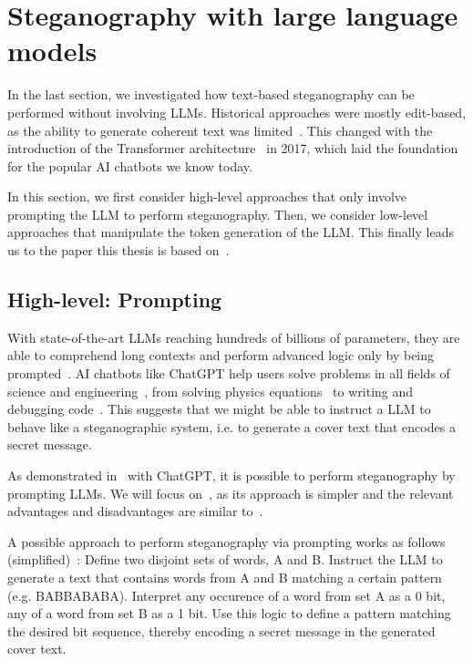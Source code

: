 \section{Steganography with large language models}
\label{sec:steganographyWithLLMs}
In the last section, we investigated how text-based steganography can be performed without involving \glspl{LLM}. Historical approaches were mostly edit-based, as the ability to generate coherent text was limited~\cite{zieglerNeuralLinguisticSteganography2019}. This changed with the introduction of the Transformer architecture~\cite{vaswaniAttentionAllYou2023} in 2017, which laid the foundation for the popular \gls{AI} chatbots we know today.

In this section, we first consider high-level approaches that only involve prompting the \gls{LLM} to perform steganography. Then, we consider low-level approaches that manipulate the token generation of the \gls{LLM}. This finally leads us to the paper this thesis is based on~\cite{zieglerNeuralLinguisticSteganography2019}.

\subsection{High-level: Prompting}
\label{sec:highLevelPrompting}
With state-of-the-art \glspl{LLM} reaching hundreds of billions of parameters, they are able to comprehend long contexts and perform advanced logic only by being prompted~\cite{hossainLLMProSAnalyzingLarge2025}. \gls{AI} chatbots like ChatGPT help users solve problems in all fields of science and engineering~\cite{schmidgallAgentLaboratoryUsing2025}, from solving physics equations~\cite{songLLMFeynmanLeveragingLarge2025,panQuantumManybodyPhysics2025} to writing and debugging code~\cite{leeGitHubRecentBugs2024,leeUnifiedDebuggingApproach2024,tianDebugBenchEvaluatingDebugging2024,shiCodeCorrectnessClosing2024}. This suggests that we might be able to instruct a \gls{LLM} to behave like a steganographic system, i.e. to generate a cover text that encodes a secret message.

As demonstrated in~\cite{steinebachNaturalLanguageSteganography2024,wuPromptingSteganographyNew2024} with ChatGPT, it is possible to perform steganography by prompting \glspl{LLM}. We will focus on~\cite{steinebachNaturalLanguageSteganography2024}, as its approach is simpler and the relevant advantages and disadvantages are similar to~\cite{wuPromptingSteganographyNew2024}.

A possible approach to perform steganography via prompting works as follows (simplified)~\cite{steinebachNaturalLanguageSteganography2024}: Define two disjoint sets of words, A and B. Instruct the LLM to generate a text that contains words from A and B matching a certain pattern (e.g. BABBABABA). Interpret any occurence of a word from set A as a 0 bit, any of a word from set B as a 1 bit. Use this logic to define a pattern matching the desired bit sequence, thereby encoding a secret message in the generated cover text.

